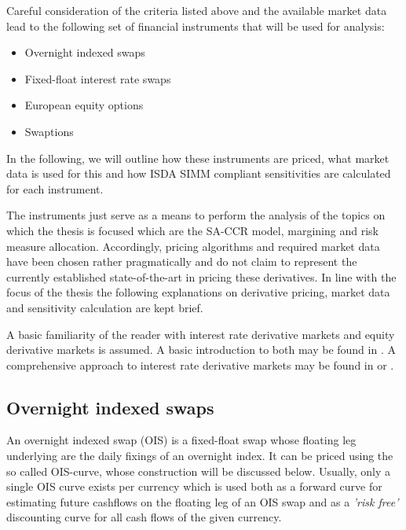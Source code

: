 \documentclass[../Thesis_AHoecherl.tex]{subfiles}
\begin{document}
    Careful consideration of the criteria listed above and the available market data lead to the following set of financial instruments that will be used for analysis:

    \begin{itemize}
        \item Overnight indexed swaps
        \item Fixed-float interest rate swaps
        \item European equity options
        \item Swaptions
    \end{itemize}

    In the following, we will outline how these instruments are priced, what market data is used for this and how \gls{ISDA SIMM} compliant sensitivities are calculated for each instrument.

    The instruments just serve as a means to perform the analysis of the topics on which the thesis is focused which are the SA-CCR model, margining and risk measure allocation.
    Accordingly, pricing algorithms and required market data have been chosen rather pragmatically and do not claim to represent the currently established state-of-the-art in pricing these derivatives.
    In line with the focus of the thesis the following explanations on derivative pricing, market data and sensitivity calculation are kept brief.  

    A basic familiarity of the reader with interest rate derivative markets and equity derivative markets is assumed. 
    A basic introduction to both may be found in \cite{hull2009options}. A comprehensive approach to interest rate derivative markets may be found in \cite{brigo2007interest} or \cite{andersen2010interest}.

    \subsection{Overnight indexed swaps}\label{sec:Overnight indexed swap}

    An overnight indexed swap (\gls{OIS}) is a fixed-float swap whose floating leg underlying are the daily fixings of an overnight index.
    It can be priced using the so called \gls{OIS}-curve, whose construction will be discussed below.
    Usually, only a single \gls{OIS} curve exists per currency which is used both as a forward curve for estimating future cashflows on the floating leg of an OIS swap and as a \emph{'risk free'} discounting curve for all cash flows of the given currency.
\end{document}
